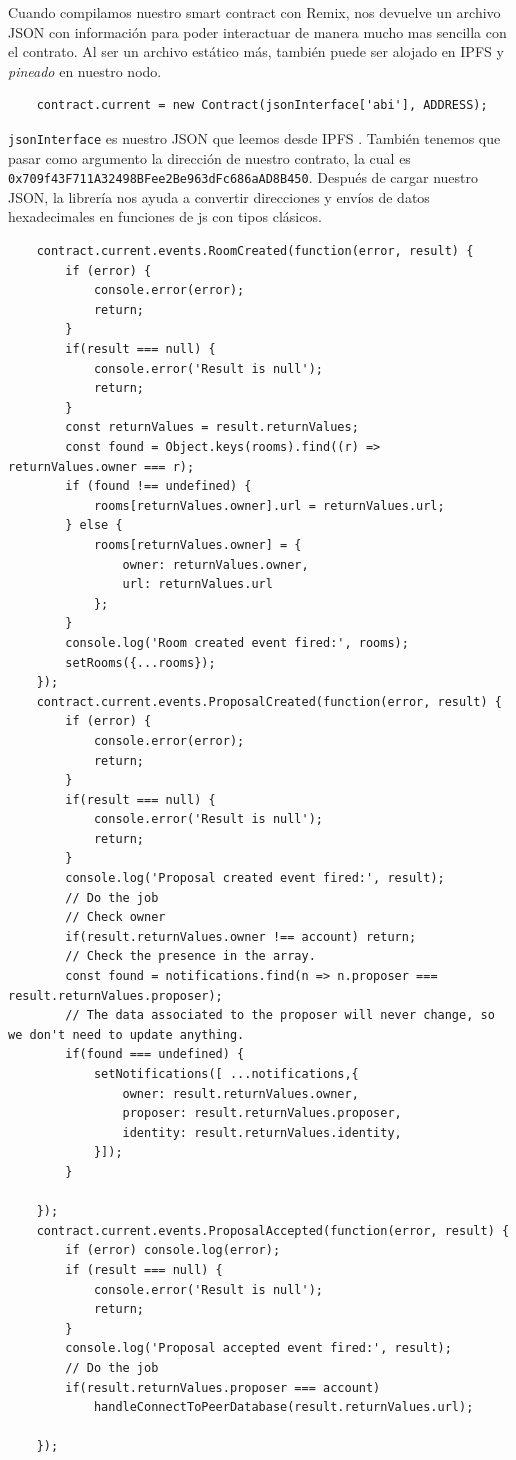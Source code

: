 Cuando compilamos nuestro smart contract con Remix, nos devuelve un archivo JSON con información para poder interactuar de manera mucho mas sencilla con el contrato.
Al ser un archivo estático más, también puede ser alojado en IPFS y \textit{pineado} en nuestro nodo.
\begin{lstlisting}
    contract.current = new Contract(jsonInterface['abi'], ADDRESS);
\end{lstlisting}
\verb|jsonInterface| es nuestro JSON que leemos desde IPFS \cite{web:ipfs}. También tenemos que pasar como argumento la dirección de nuestro contrato, la cual es \verb|0x709f43F711A32498BFee2Be963dFc686aAD8B450|.
Después de cargar nuestro JSON, la librería nos ayuda a convertir direcciones y envíos de datos hexadecimales en funciones de js con tipos clásicos.
\begin{lstlisting}
    contract.current.events.RoomCreated(function(error, result) {
        if (error) {
            console.error(error);
            return;
        }
        if(result === null) {
            console.error('Result is null');
            return;
        }
        const returnValues = result.returnValues;
        const found = Object.keys(rooms).find((r) => returnValues.owner === r);
        if (found !== undefined) {
            rooms[returnValues.owner].url = returnValues.url;
        } else {
            rooms[returnValues.owner] = {
                owner: returnValues.owner,
                url: returnValues.url
            };
        }
        console.log('Room created event fired:', rooms);
        setRooms({...rooms});
    });
    contract.current.events.ProposalCreated(function(error, result) {
        if (error) {
            console.error(error);
            return;
        }
        if(result === null) {
            console.error('Result is null');
            return;
        }
        console.log('Proposal created event fired:', result);
        // Do the job
        // Check owner
        if(result.returnValues.owner !== account) return;
        // Check the presence in the array.
        const found = notifications.find(n => n.proposer === result.returnValues.proposer);
        // The data associated to the proposer will never change, so we don't need to update anything.
        if(found === undefined) {
            setNotifications([ ...notifications,{
                owner: result.returnValues.owner,
                proposer: result.returnValues.proposer,
                identity: result.returnValues.identity,
            }]);
        }
        
    });
    contract.current.events.ProposalAccepted(function(error, result) {
        if (error) console.log(error);
        if (result === null) {
            console.error('Result is null');
            return;
        }
        console.log('Proposal accepted event fired:', result);
        // Do the job
        if(result.returnValues.proposer === account) 
            handleConnectToPeerDatabase(result.returnValues.url);

    });
\end{lstlisting}
